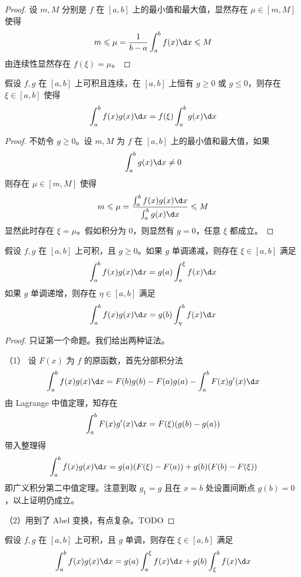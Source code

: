 \begin{proof}
	设 $m, M$ 分别是 $f$ 在 $[a,b]$ 上的最小值和最大值，显然存在 $\mu \in [m, M]$ 使得
	\[ m \leqslant \mu = \frac{1}{b-a}\int_{a}^{b} f(x) \d x \leqslant M \]
	由连续性显然存在 $f(\xi) = \mu$。
\end{proof}

\begin{theorem}[广义积分第一中值定理]
	假设 $f, g$ 在 $[a, b]$ 上可积且连续，在 $[a,b]$ 上恒有 $g \geqslant 0$ 或 $g \leqslant 0$，则存在 $\xi \in [a,b]$ 使得
	\[ \int_{a}^{b} f(x)g(x) \d x = f(\xi) \int_{a}^{b} g(x) \d x \]
\end{theorem}

\begin{proof}
	不妨令 $g \geqslant 0$。设 $m, M$ 为 $f$ 在 $[a, b]$ 上的最小值和最大值，如果
	\[ \int_{a}^{b} g(x) \d x \neq 0 \]
	则存在 $\mu \in [m, M]$ 使得
	\[ m \leqslant \mu = \frac{ \int_{a}^{b} f(x)g(x) \d x}{\int_{a}^{b} g(x) \d x} \leqslant M \]
	显然此时存在 $\xi = \mu$。假如积分为 $0$，则显然有 $g = 0$，任意 $\xi$ 都成立。
\end{proof}

\begin{theorem}[积分第二中值定理]
	假设 $f, g$ 在 $[a,b]$ 上可积，且 $g \geqslant 0$。如果 $g$ 单调递减，则存在 $\xi \in [a, b]$ 满足
	\[ \int_{a}^{b} f(x) g(x) \d x = g(a) \int_{a}^{\xi} f(x) \d x \]
	如果 $g$ 单调递增，则存在 $\eta \in [a, b]$ 满足
	\[ \int_{a}^{b} f(x) g(x) \d x = g(b) \int_{\eta}^{b} f(x) \d x \]
\end{theorem}

\begin{proof}
	只证第一个命题。我们给出两种证法。

	（1） 设 $F(x)$ 为 $f$ 的原函数，首先分部积分法
	\[ \int_{a}^{b} f(x) g(x) \d x = F(b)g(b) - F(a)g(a) - \int_{a}^{b} F(x)g'(x) \d x \]
	由 Lagrange 中值定理，知存在
	\[ \int_{a}^{b} F(x)g'(x) \d x = F(\xi) (g(b) - g(a)) \]
	带入整理得
	\[ \int_{a}^{b} f(x) g(x) \d x = g(a) (F(\xi) - F(a)) + g(b) (F(b) - F(\xi)) \]
	即广义积分第二中值定理。注意到取 $g_1 = g$ 且在 $x=b$ 处设置间断点 $g(b) = 0$，以上证明仍成立。

	（2）用到了 Abel 变换，有点复杂。TODO
\end{proof}

\begin{theorem}[广义积分第二中值定理]
	假设 $f, g$ 在 $[a,b]$ 上可积，且 $g$ 单调，则存在 $\xi \in [a, b]$ 满足
	\[ \int_{a}^{b} f(x) g(x) \d x = g(a) \int_{a}^{\xi} f(x) \d x + g(b) \int_{\xi}^{b} f(x) \d x \]
\end{theorem}

